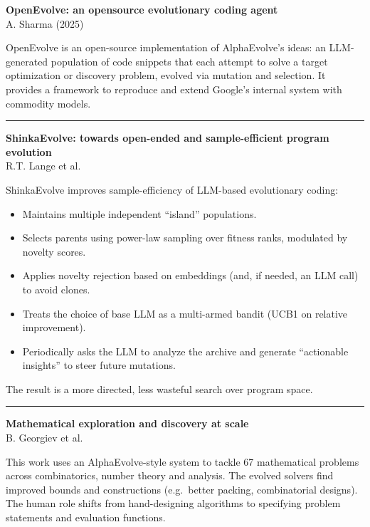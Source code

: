 \documentclass[a5paper]{article}
\providecommand{\tightlist}{%
  \setlength{\itemsep}{0pt}\setlength{\parskip}{0pt}}
\begin{document}
\textbf{OpenEvolve: an opensource evolutionary coding agent}\\
A. Sharma (2025)

OpenEvolve is an open-source implementation of AlphaEvolve's ideas: an
LLM-generated population of code snippets that each attempt to solve a
target optimization or discovery problem, evolved via mutation and
selection. It provides a framework to reproduce and extend Google's
internal system with commodity models.

\begin{center}\rule{0.5\linewidth}{0.5pt}\end{center}

\textbf{ShinkaEvolve: towards open-ended and sample-efficient program
evolution}\\
R.T. Lange et al.

ShinkaEvolve improves sample-efficiency of LLM-based evolutionary
coding:

\begin{itemize}
\tightlist
\item
  Maintains multiple independent ``island'' populations.
\item
  Selects parents using power-law sampling over fitness ranks, modulated
  by novelty scores.
\item
  Applies novelty rejection based on embeddings (and, if needed, an LLM
  call) to avoid clones.
\item
  Treats the choice of base LLM as a multi-armed bandit (UCB1 on
  relative improvement).
\item
  Periodically asks the LLM to analyze the archive and generate
  ``actionable insights'' to steer future mutations.
\end{itemize}

The result is a more directed, less wasteful search over program space.

\begin{center}\rule{0.5\linewidth}{0.5pt}\end{center}

\textbf{Mathematical exploration and discovery at scale}\\
B. Georgiev et al.

This work uses an AlphaEvolve-style system to tackle 67 mathematical
problems across combinatorics, number theory and analysis. The evolved
solvers find improved bounds and constructions (e.g.~better packing,
combinatorial designs). The human role shifts from hand-designing
algorithms to specifying problem statements and evaluation functions.
\end{document}

